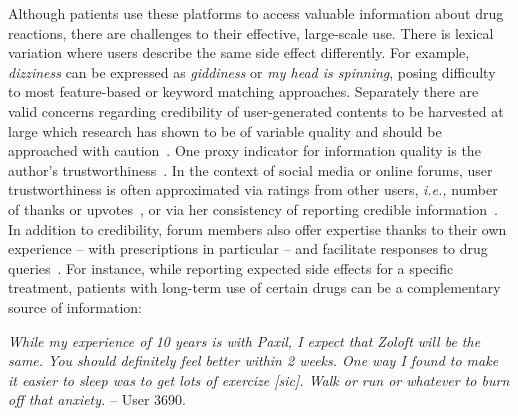 \documentclass{bmcart}
\begin{document}
Although patients use these platforms to access valuable information about drug reactions, there are challenges to their effective, large-scale use. There is lexical variation where users describe the same side effect differently.  For example, \textit{dizziness} can be expressed as
\textit{giddiness} or \textit{my head is spinning}, posing difficulty to most feature-based or keyword matching approaches. Separately there are valid concerns regarding credibility of user-generated contents to be harvested at large which research
has shown to be of variable quality and should be approached with caution~\cite{impicciatore1997reliability,peterson2003consumers,hajli2015credibility}. One proxy indicator for information quality is the author's trustworthiness~\cite{li2016survey}. In the context of social media or online forums, user trustworthiness is 
often approximated via ratings from other users, \textit{i.e.,} number of thanks or upvotes~\cite{rains2009health}, or via her consistency of reporting credible information~\cite{hoang2018authenticity,mukherjee2014people}. In addition to credibility, forum members also offer expertise thanks to their own experience -- with prescriptions in particular -- and facilitate responses to drug queries~\cite{vydiswaran2019identifying}. For instance, while reporting expected side effects for a specific treatment, patients with long-term use of certain drugs can be a complementary source of information:  %

{\footnotesize
{\it While my experience of 10 years is with Paxil, I expect that Zoloft will be the same. You should definitely feel better within 2 weeks. One way I found to make it easier to sleep was to get lots of exercize [sic]. Walk or run or whatever to burn off that anxiety.} -- User 3690.
}
\end{document}
